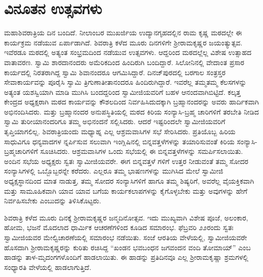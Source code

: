 
\chapter{ವಿನೂತನ ಉತ್ಸವಗಳು}

\noindent

ಮಹಾಶಿವರಾತ್ರಿಯ ದಿನ ಬಂದಿದೆ. ನೀಲಾಂಬರ ಮುಖರ್ಜಿಯ ಉದ್ಯಾನಗೃಹದಲ್ಲಿನ ರಾಮ ಕೃಷ್ಣ ಮಠದಲ್ಲೇ ಈ ಕಾರ್ಯಕ್ರಮ ನಡೆಯುವ ಏರ್ಪಾಡಾಗಿದೆ. ಶಿವರಾತ್ರಿ ಕಳೆದ ಮೂರು ದಿನಗಳಿಗೇ ಶ್ರೀರಾಮಕೃಷ್ಣರ ಜಯಂತ್ಯುತ್ಸವ. ಇವೆರಡೂ ಮಠದಲ್ಲಿ ಅತ್ಯಂತ ಸಂಭ್ರಮದಿಂದ ನಡೆಯುವ ಉತ್ಸವಗಳು. ಆದ್ದರಿಂದ ಮಠದಲ್ಲೆಲ್ಲ ವಿಶೇಷ ಉತ್ಸಾಹದ ವಾತಾವರಣ. ಸ್ವಾಮಿ ಶಾರದಾನಂದರು ಅಮೆರಿಕದಿಂದ ಹಿಂದಿರುಗಿ ಬಂದಿದ್ದಾರೆ. ಸಿಲೋನಿನಲ್ಲಿ ವೇದಾಂತ ಪ್ರಸಾರ ಕಾರ್ಯದಲ್ಲಿ ನಿರತರಾಗಿದ್ದ ಸ್ವಾಮಿ ಶಿವಾನಂದರೂ ಆಗಮಿಸಿದ್ದಾರೆ. ದಿನಜ್​ಪುರದಲ್ಲಿ ಬರಗಾಲ ಸಂತ್ರಸ್ತರ ಸೇವಾಕಾರ್ಯವನ್ನು ಪೂರೈಸಿ ಸ್ವಾಮಿ ತ್ರಿಗುಣಾತೀತಾನಂದರೂ ಹಿಂದಿರುಗಿದ್ದಾರೆ. ಇವರೆಲ್ಲ ತಮ್ಮತಮ್ಮ ಕೆಲಸಗಳನ್ನು ಅತ್ಯಂತ ಯಶಸ್ವಿಯಾಗಿ ಮಾಡಿ ಮುಗಿಸಿ ಬಂದದ್ದರಿಂದ ಸ್ವಾಮೀಜಿಯವರಿಗೆ ಬಹಳ ಆನಂದವಾಗಿಬಿಟ್ಟಿದೆ. ಕಲ್ಕತ್ತ ಕೇಂದ್ರದ ಅಧ್ಯಕ್ಷರಾಗಿ ಮಠದ ಕಾರ್ಯವನ್ನು ಕೌಶಲದಿಂದ ನಿರ್ವಹಿಸಿದುದಕ್ಕಾಗಿ ಬ್ರಹ್ಮಾನಂದರನ್ನು ಅವರು ಹಾರ್ದಿಕವಾಗಿ ಅಭಿನಂದಿಸಿದರು. ಮತ್ತು ಬ್ರಹ್ಮಾನಂದರ ಅನುಪಸ್ಥಿತಿಯಲ್ಲಿ ಮಠದ ಕಿರಿಯ ಸಂನ್ಯಾಸಿ-ಬ್ರಹ್ಮ ಚಾರಿಗಳಿಗೆ ತರಬೇತಿ ನೀಡಿದ ಸ್ವಾಮಿ ತುರೀಯಾನಂದರಿಗೂ ತಮ್ಮ ಅಭಿನಂದನೆ ಸಲ್ಲಿಸಿದರು. ಆದರೆ ಇಷ್ಟರಿಂದಲೇ ಸ್ವಾಮೀಜಿಯವರಿಗೆ ತೃಪ್ತಿಯಾಗಲಿಲ್ಲ. ಶಿವರಾತ್ರಿಯಂದು ಮಧ್ಯಾಹ್ನ ಎಲ್ಲ ಆಶ್ರಮವಾಸಿಗಳ ಸಭೆ ಸೇರಿಸಿದರು. ಪ್ರತಿಯೊಬ್ಬ ಹಿರಿಯ ಸಾಧುವಿಗೂ ಧನ್ಯವಾದಗಳ ನ್ನರ್ಪಿಸುವ ಸಲುವಾಗಿ ಇಂಗ್ಲಿಷಿನಲ್ಲಿ ಬಿನ್ನವತ್ತಳೆಗಳನ್ನು ತಯಾರಿಸುವಂತೆ ಕಿರಿಯ ಸಂನ್ಯಾಸಿ- ಬ್ರಹ್ಮಚಾರಿಗಳಿಗೆ ಸೂಚಿಸಿದರು. ಆಶ್ರಮವಾಸಿಗಳ ಒಂದು ಸಭೆಯಲ್ಲಿ ಈ ಬಿನ್ನವತ್ತಳೆಗಳನ್ನು ಸಮರ್ಪಿಸಲಾಯಿತು. ಅಂದಿನ ಸಭೆಯ ಅಧ್ಯಕ್ಷರು ಸ್ವತಃ ಸ್ವಾಮೀಜಿಯವರೇ. ಈಗ ಬಿನ್ನವತ್ತಳೆ ಗಳಿಗೆ ಉತ್ತರ ನೀಡುವಂತೆ ತಮ್ಮ ಸೋದರ ಸಂನ್ಯಾಸಿಗಳಲ್ಲಿ ಒಬ್ಬೊಬ್ಬರನ್ನೇ ಕರೆದರು. ಎಲ್ಲರೂ ತಮ್ಮ ಭಾಷಣಗಳನ್ನು ಮುಗಿಸಿದ ಮೇಲೆ ಸ್ವಾಮೀಜಿ ಅಧ್ಯಕ್ಷಸ್ಥಾನದಿಂದ ಮಾತ ನಾಡುತ್ತ, ತಮ್ಮ ಸೋದರ ಸಂನ್ಯಾಸಿಗಳಿಗೆ ಹಾಗೂ ತಮ್ಮ ಶಿಷ್ಯರಿಗೆ, ಅವರೆಲ್ಲ ವೈಯಕ್ತಿಕವಾಗಿ ಮತ್ತು ಸಾಮೂಹಿಕವಾಗಿ ಯಾವ ಯಾವ ಬಗೆಯ ಕಾರ್ಯಕಲಾಪಗಳನ್ನು ಕೈಗೊಳ್ಳಬೇಕು ಮತ್ತು ಅವುಗಳನ್ನು ಹೇಗೆ ನಿರ್ವಹಿಸಬೇಕು ಎಂಬುದನ್ನು ತಿಳಿಸಿಕೊಟ್ಟರು.

ಶಿವರಾತ್ರಿ ಕಳೆದ ಮೂರು ದಿನಕ್ಕೆ ಶ್ರೀರಾಮಕೃಷ್ಣರ ಜನ್ಮದಿನೋತ್ಸವ. ಇದು ಮುಖ್ಯವಾಗಿ ವಿಶೇಷ ಪೂಜೆ, ಅಲಂಕಾರ, ಹೋಮ, ಭಜನೆ ಮೊದಲಾದ ಧಾರ್ಮಿಕ ಆಚರಣೆಗಳಿಂದ ಕೂಡಿದ ಸಮಾರಂಭ. ಫೆಬ್ರವರಿ ೨೨ರಂದು ಸ್ವತಃ ಸ್ವಾಮೀಜಿಯವರ ಮೇಲ್ವಿಚಾರಣೆಯಲ್ಲಿ ಸಮಾರಂಭ ನಡೆಯಿತು. ಸಂಜೆ ಆರತಿಯ ವೇಳೆಯಲ್ಲಿ, ಸ್ವಾಮೀಜಿಯವರೇ ಹೊಸದಾಗಿ ಶ್ರೀರಾಮಕೃಷ್ಣರನ್ನು ಕುರಿತು ರಚಿಸಿದ್ದ “ಖಂಡನ ಭವಬಂಧನ ಜಗವಂದನ ವಂದಿ ತೋಮಾಯ್​” ಎಂಬ ಹಾಡನ್ನು ತಾಳ-ಮೃದಂಗಗಳೊಂದಿಗೆ ಹಾಡಲಾಯಿತು. ಈ ಹಾಡನ್ನು ಪ್ರತಿದಿನವೂ ಎಲ್ಲ ಶ್ರೀರಾಮಕೃಷ್ಣಾ ಶ್ರಮಗಳಲ್ಲಿ ಸಂಧ್ಯಾರತಿ ವೇಳೆಯಲ್ಲಿ ಹಾಡಲಾಗುತ್ತಿದೆ.

